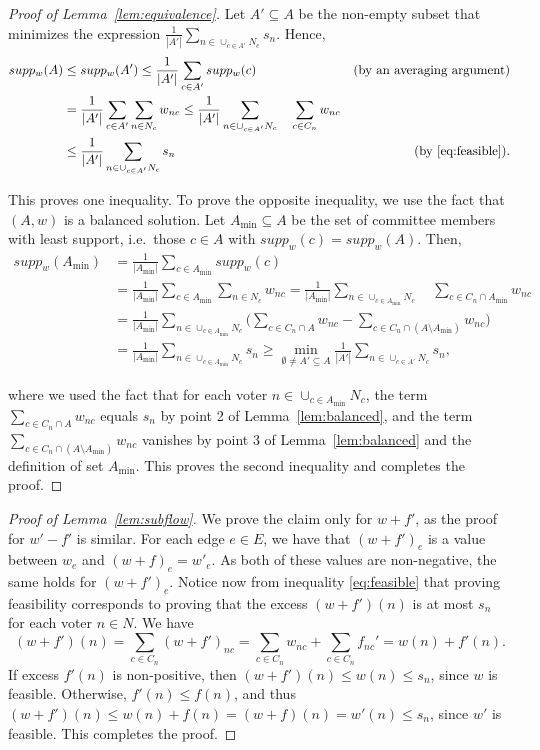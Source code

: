 \begin{proof}[Proof of Lemma~\ref{lem:equivalence}]
Let $A'\subseteq A$ be the non-empty subset that minimizes the expression $\frac{1}{|A'|} \sum_{n\in \cup_{c\in A'} N_c} s_n$. Hence, 
\begin{align*}
    supp_w(A) &\leq supp_w(A') \leq \frac{1}{|A'|} \sum_{c\in A'} supp_w(c) &\text{(by an averaging argument)}\\
    & = \frac{1}{|A'|} \sum_{c\in A'} \sum_{n\in N_c} w_{nc} 
     \leq \frac{1}{|A'|}  \sum_{n\in \cup_{c\in A'} N_c} \quad \sum_{c\in C_n} w_{nc} \\
    & \leq \frac{1}{|A'|} \sum_{n\in \cup_{c\in A'} N_c} s_n &\text{(by \ref{eq:feasible})}.
\end{align*}

This proves one inequality. To prove the opposite inequality, we use the fact that $(A,w)$ is a balanced solution. 
Let $A_{\min}\subseteq A$ be the set of committee members with least support, i.e.~those $c\in A$ with $supp_w(c)=supp_w(A)$. Then,
\begin{align*}
    supp_w(A_{\min}) &= \frac{1}{|A_{\min}|} \sum_{c\in A_{\min}} supp_w(c) \\
    &= \frac{1}{|A_{\min}|} \sum_{c\in A_{\min}} \sum_{n\in N_c} w_{nc} 
    = \frac{1}{|A_{\min}|} \sum_{n\in \cup_{c\in A_{\min}} N_c} \quad \sum_{c\in C_n\cap A_{\min}} w_{nc} \\
    &= \frac{1}{|A_{\min}|} \sum_{n\in \cup_{c\in A_{\min}} N_c} \Big( \sum_{c\in C_n\cap A} w_{nc} 
		- \sum_{c\in C_n \cap (A\setminus A_{\min})} w_{nc}\Big)\\
		&= \frac{1}{|A_{\min}|}\sum_{n\in \cup_{c\in A_{\min}} N_c} s_n \geq \min_{\emptyset\neq A'\subseteq A} \frac{1}{|A'|}\sum_{n\in \cup_{c\in A'}N_c} s_n,
\end{align*}

where we used the fact that for each voter $n\in \cup_{c\in A_{\min}} N_c$, the term $\sum_{c\in C_n\cap A} w_{nc}$ equals $s_n$ by point 2 of Lemma~\ref{lem:balanced}, and the term $\sum_{c\in C_n \cap (A\setminus A_{\min})} w_{nc}$ vanishes by point 3 of Lemma~\ref{lem:balanced} and the definition of set $A_{\min}$. 
This proves the second inequality and completes the proof.
\end{proof}


\begin{proof}[Proof of Lemma~\ref{lem:subflow}]
We prove the claim only for $w+f'$, as the proof for $w'-f'$ is similar. 
For each edge $e\in E$, we have that $(w+f')_e$ is a value between $w_e$ and $(w+f)_e=w'_e$. As both of these values are non-negative, the same holds for $(w+f')_e$. 
Notice now from inequality \eqref{eq:feasible} that proving feasibility corresponds to proving that the excess $(w+f')(n)$ is at most $s_n$ for each voter $n\in N$. We have 
$$(w+f')(n) = \sum_{c\in C_n} (w+f')_{nc}= \sum_{c\in C_n} w_{nc} + \sum_{c\in C_n} f_{nc}' = w(n) + f'(n). $$
If excess $f'(n)$ is non-positive, then $(w+f')(n)\leq w(n) \leq s_n$, since $w$ is feasible. 
Otherwise, $f'(n)\leq f(n)$, and thus $(w+f')(n)\leq w(n) + f(n) = (w+f)(n) = w'(n) \leq s_n$, since $w'$ is feasible. This completes the proof.
\end{proof}


